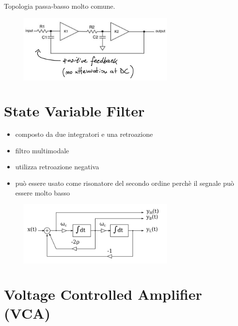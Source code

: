Topologia passa-basso molto comune.

\begin{figure}[H]
    \centering
    \includegraphics[width=0.7\textwidth]{capitoli/capitolo12/immagini/image3.png}
\end{figure}

\section{State Variable Filter}

\begin{itemize}
    \item composto da due integratori e una retroazione
    \item filtro multimodale
    \item utilizza retroazione negativa
    \item può essere usato come risonatore del secondo ordine perchè il segnale può essere molto basso
\end{itemize}

\begin{figure}[H]
    \centering
    \includegraphics[width=0.7\textwidth]{capitoli/capitolo12/immagini/image4.png}
\end{figure}
\vspace{8cm}
\section{Voltage Controlled Amplifier (VCA)}

